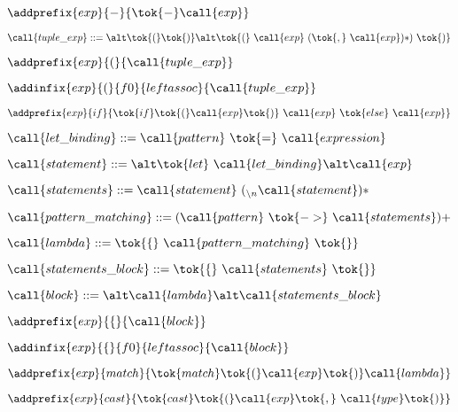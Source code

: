  
   \item $\addprefix{exp}{-}{\tok{-} \call{exp}}$
    
 
   \item $\call{tuple\_exp} ::=\\
   \alt \tok{(}\tok{)}\\
   \alt \tok{(}\ \call{exp}\ (\tok{,}\ \call{exp})* )\ \tok{)}$
   \item $\addprefix{exp}{(}{\call{tuple\_exp}}$
   \item $\addinfix{exp}{(}{f0}{leftassoc}{\call{tuple\_exp}}$
    
 
   \item $\addprefix{exp}{if}{\tok{if} \tok{(} \call{exp} \tok{)}
   \ \call{exp}\ \tok{else}\ \call{exp}}$
    
 
   \item $\call{let\_binding} ::= \call{pattern}\ \tok{=}\ \call{expression}$
     
 
   \item $\call{statement} ::=\\
   \alt \tok{let}\ \call{let\_binding}\\
   \alt \call{exp}$
   \item $\call{statements} ::= \call{statement}\ ({}_{\backslash{}n}\call{statement})*$
   \item $\call{pattern\_matching} ::= (\call{pattern}\ \tok{->}\ \call{statements})+$

   \item $\call{lambda} ::= \tok{\{}\ \call{pattern\_matching}\ \tok{\}}$
   \item $\call{statements\_block} ::= \tok{\{}\ \call{statements}\ \tok{\}}$
   \item $\call{block} ::=\\
   \alt \call{lambda}\\
   \alt \call{statements\_block} $

   
 
   \item $\addprefix{exp}{\{}{\call{block}}$
   \item $\addinfix{exp}{\{}{f0}{leftassoc}{\call{block}}$
    
 
   \item $\addprefix{exp}{match}{\tok{match} \tok{(} \call{exp} \tok{)} \call{lambda}}$
   
 
   \item $\addprefix{exp}{cast}{\tok{cast}\tok{(} \call{exp} 
   \tok{,}\ \call{type} \tok{)}}$
    
